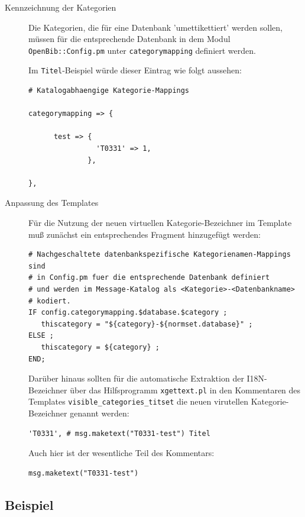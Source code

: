 \documentclass[11pt, twoside, a4paper, BCOR8mm, DIV12, bibtotoc,idxtotoc]{scrbook}
\begin{document}
\begin{description}
\item[Kennzeichnung der Kategorien] Die Kategorien, die für eine
  Datenbank 'umettikettiert' werden sollen, müssen für die
  entsprechende Datenbank in dem Modul \texttt{OpenBib::Config.pm}
  unter \texttt{categorymapping} definiert werden.

  Im \texttt{Titel}-Beispiel würde dieser Eintrag wie folgt aussehen:
  
\begin{verbatim}
# Katalogabhaengige Kategorie-Mappings

categorymapping => {

      test => {
                'T0331' => 1,
              },

},
\end{verbatim}


\item[Anpassung des Templates] Für die Nutzung der neuen virtuellen
  Kategorie-Bezeichner im Template muß zunächst ein entsprechendes Fragment
  hinzugefügt werden:

\begin{verbatim}
# Nachgeschaltete datenbankspezifische Kategorienamen-Mappings sind
# in Config.pm fuer die entsprechende Datenbank definiert
# und werden im Message-Katalog als <Kategorie>-<Datenbankname>
# kodiert.
IF config.categorymapping.$database.$category ;
   thiscategory = "${category}-${normset.database}" ;
ELSE ;
   thiscategory = ${category} ;
END;
\end{verbatim}

  Darüber hinaus sollten für die automatische Extraktion der
  I18N-Bezeichner über das Hilfs\-programm \texttt{xgettext.pl} in den Kommentaren des
  Templates \texttt{visible\_categories\_titset} die neuen virutellen
  Kategorie-Bezeichner genannt werden:

\begin{verbatim}
'T0331', # msg.maketext("T0331-test") Titel
\end{verbatim}

  Auch hier ist der wesentliche Teil des Kommentars:

\begin{verbatim}
msg.maketext("T0331-test")
\end{verbatim}

\end{description}
\subsection{Beispiel}
\end{document}

